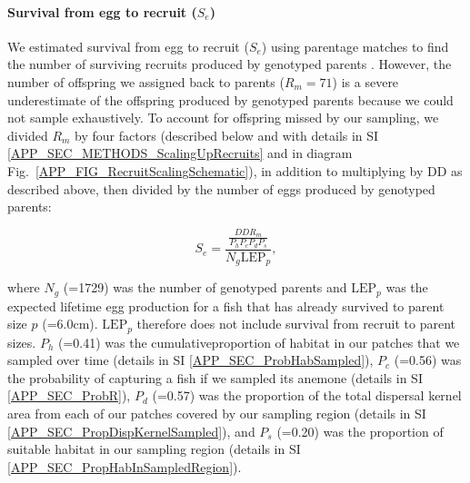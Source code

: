\documentclass[12pt, oneside]{article}   	%
\begin{document}
\paragraph*{Survival from egg to recruit ($S_e$)}

We estimated survival from egg to recruit ($S_e$) using parentage matches to find the number of surviving recruits produced by genotyped parents \citep[similar to][]{johnson2018integrating}. However, the number of offspring we assigned back to parents ($R_m = 71$) is a severe underestimate of the offspring produced by genotyped parents because we could not sample exhaustively. To account for offspring missed by our sampling, we divided $R_m$ by four factors (described below and with details in SI \ref{APP_SEC_METHODS_ScalingUpRecruits} and in diagram Fig.\ \ref{APP_FIG_RecruitScalingSchematic}), in addition to multiplying by $\text{DD}$ as described above, then divided by the number of eggs produced by genotyped parents:

\begin{equation}
S_e = \frac{\frac{DD R_m}{P_h P_c P_d P_s}}{N_g \text{LEP}_p}, \label{EQN_EggRecruitSurv}
\end{equation}

where $N_g$ (=1729) was the number of genotyped parents and $\text{LEP}_p$ was the expected lifetime egg production for a fish that has already survived to parent size $p$ (=6.0cm). $\text{LEP}_p$ therefore does not include survival from recruit to parent sizes. $P_h$ (=0.41) was the cumulativeproportion of habitat in our patches that we sampled over time (details in SI \ref{APP_SEC_ProbHabSampled}), $P_c$ (=0.56) was the probability of capturing a fish if we sampled its anemone (details in SI \ref{APP_SEC_ProbR}), $P_d$ (=0.57) was the proportion of the total dispersal kernel area from each of our patches covered by our sampling region (details in SI \ref{APP_SEC_PropDispKernelSampled}), and $P_s$ (=0.20) was the proportion of suitable habitat in our sampling region (details in SI \ref{APP_SEC_PropHabInSampledRegion}).
\end{document}

